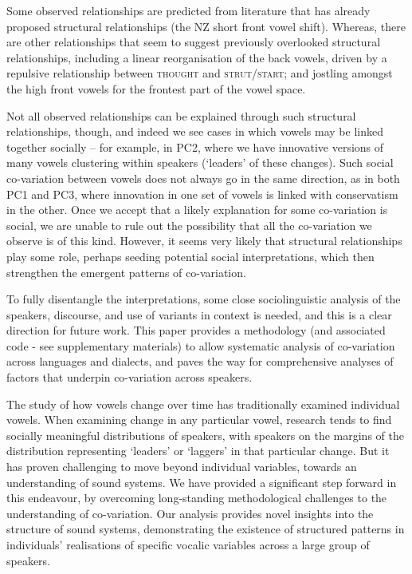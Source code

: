 \documentclass[review]{elsarticle} %
\begin{document}
Some observed relationships are predicted from literature that has already proposed structural relationships (the NZ short front vowel shift). Whereas, there are other relationships that seem to suggest previously overlooked structural relationships, including a linear reorganisation of the back vowels, driven by a repulsive relationship between \textsc{thought} and \textsc{strut/start}; and jostling amongst the high front vowels for the frontest part of the vowel space.  

Not all observed relationships can be explained through such structural relationships, though, and indeed we see cases in which vowels may be linked together socially -- for example, in PC2, where we have innovative versions of many vowels clustering within speakers (`leaders' of these changes).  Such social co-variation between vowels does not always go in the same direction, as in both PC1 and PC3, where innovation in one set of vowels is linked with conservatism in the other.  Once we accept that a likely explanation for some co-variation is social, we are unable to rule out the possibility that all the co-variation we observe is of this kind.  However, it seems very likely that structural relationships play some role, perhaps seeding potential social interpretations, which then strengthen the emergent patterns of co-variation.

To fully disentangle the interpretations, some close sociolinguistic analysis of the speakers, discourse, and use of variants in context is needed, and this is a clear direction for future work.  This paper provides a methodology (and associated code - see supplementary materials) to allow systematic analysis of co-variation across languages and dialects, and paves the way for comprehensive analyses of factors that underpin co-variation across speakers. 

The study of how vowels change over time has traditionally examined individual vowels. When examining change in any particular vowel, research tends to find socially meaningful distributions of speakers, with speakers on the margins of the distribution representing `leaders' or `laggers' in that particular change. But it has proven challenging to move beyond individual variables, towards an understanding of sound systems.  We have provided a significant step forward in this endeavour, by overcoming long-standing methodological challenges to the understanding of co-variation.  Our analysis provides novel insights into the structure of sound systems, demonstrating the existence of structured patterns in individuals' realisations of specific vocalic variables across a large group of speakers.
\end{document}
